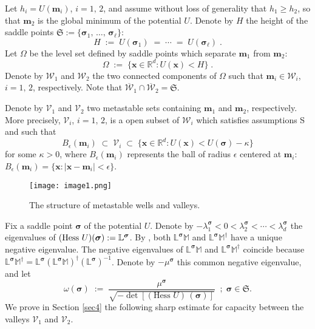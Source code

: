 \documentclass[reqno]{amsart}
\newcounter{as}[section]
\newcommand{\mc}[1]{{\mathcal #1}}
\newcommand{\mf}[1]{{\mathfrak #1}}
\newcommand{\bb}[1]{{\mathbb #1}}
\newcommand{\bs}[1]{{\boldsymbol #1}}
\newcommand{\<}{\langle}
\renewcommand{\>}{\rangle}
\begin{document}
\smallskip{} Let $h_{i} =
U(\bs{m}_{i})$, $i=1,\,2$, and assume without loss of generality that
$h_{1}\ge h_{2}$, so that $\bs{m}_{2}$ is the global minimum of the
potential $U$. Denote by $H$ the height of the saddle points
$\mf{S}:=\{\bs{\sigma}_{1},\,\dots,\,\bs{\sigma}_{\ell}\}$:
\begin{equation*}
H\;:=\;U(\bs{\sigma}_{1})\;=\;\cdots\;=\;U(\bs{\sigma}_{\ell})\; .
\end{equation*}
Let $\Omega$ be the level set defined by saddle points which separate
$\bs m_1$ from $\bs m_2$:
\begin{equation*}
\Omega\;:=\;\{\bs{x}\in\bb R^d:U(\bs{x})<H\}\;.
\end{equation*}
Denote by $\mc{W}_{1}$ and $\mc{W}_{2}$ the two connected components
of $\Omega$ such that $\bs{m}_{i}\in\mc{W}_{i}$, $i=1,\,2$,
respectively. Note that $\overline{\mc{W}}_{1} \cap
\overline{\mc{W}}_{2} =\mf{S}$.

Denote by $\mc{V}_{1}$ and $\mc{V}_{2}$ two metastable sets containing
$\bs{m}_1$ and $\bs{m}_2$, respectively. More precisely, $\mc{V}_i$,
$i=1,\,2$, is a open subset of $\mc{W}_i$ which satisfies assumptions S and
such that
\begin{equation*}
B_\epsilon(\bs{m}_i) \;\subset\; \mc V_i \;\subset\;
\{\bs{x} \in \bb R^d :  U(\bs{x}) < U(\bs{\sigma})- \kappa \}
\end{equation*}
for some $\kappa>0$, where $B_\epsilon(\bs{m}_i)$ represents the ball
of radius $\epsilon$ centered at $\bs{m}_i$: $B_\epsilon(\bs{m}_i) =
\{\bs{x}: |\bs{x}-\bs{m}_i| <\epsilon\}$.

\begin{figure}
  \protect
\texttt{[image: image1.png]}\protect
  \caption{\label{fig1}The structure of metastable wells and valleys.}
\end{figure}

\smallskip{}  Fix a saddle point
$\bs{\sigma}$ of the potential $U$.  Denote by
$-\lambda_{1}^\bs{\sigma}<0<\lambda_{2}^\bs{\sigma} < \cdots <
\lambda_{d}^\bs{\sigma}$ the eigenvalues of $(\textup{Hess }U)
(\bs{\sigma}):=\bb L^\bs{\sigma}$. By \cite[Lemma A.1]{LS1}, both
$\bb{L}^\bs{\sigma} \bb M$ and $\bb{L}^\bs{\sigma} \bb M^{\dagger}$
have a unique negative eigenvalue. The negative eigenvalues of
$\bb{L}^\bs{\sigma} \bb M$ and $\bb{L}^\bs{\sigma} \bb M^{\dagger}$
coincide because $\bb{L}^\bs{\sigma}
\bb{M}^{\dagger}=\bb{L}^\bs{\sigma}
(\bb{L}^\bs{\sigma}\bb{M})^{\dagger}(\bb{L}^\bs{\sigma})^{-1}$.
Denote by $-\mu^\bs{\sigma}$ this common negative eigenvalue, and let
\begin{equation}
\label{omega}
\omega(\bs{\sigma})\;:=\;\frac{\mu^\bs{\sigma}}
{\sqrt{-\det\left[(\text{Hess }U) \, (\bs{\sigma})\right]}}
\;\;;\;\bs{\sigma}\in\mathfrak{S}.
\end{equation}
We prove in Section \ref{sec4} the following sharp estimate for
capacity between the valleys $\mc{V}_{1}$ and $\mc{V}_{2}$.
\end{document}

